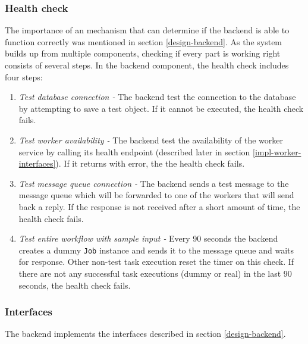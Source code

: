 \subsubsection{Health check} \label{impl-backend-healthcheck}

The importance of an mechanism that can determine if the backend is able to function correctly was mentioned in section \ref{design-backend}. As the system builds up from multiple components, checking if every part is working right consists of several steps. In the backend component, the health check includes four steps:

\begin{enumerate}
	\item \emph{Test database connection - }The backend test the connection to the database by attempting to save a test object. If it cannot be executed, the health check fails.
	\item \emph{Test worker availability - }The backend test the availability of the worker service by calling its health endpoint (described later in section \ref{impl-worker-interfaces}). If it returns with error, the the health check fails.
	\item \emph{Test message queue connection - }The backend sends a test message to the message queue which will be forwarded to one of the workers that will send back a reply. If the response is not received after a short amount of time, the health check fails.
	\item \emph{Test entire workflow with sample input - }Every 90 seconds the backend creates a dummy \texttt{Job} instance and sends it to the message queue and waits for response. Other non-test task execution reset the timer on this check. If there are not any successful task executions (dummy or real) in the last 90 seconds, the health check fails.
\end{enumerate}

\subsubsection{Interfaces} \label{impl-backend-interfaces}

The backend implements the interfaces described in section \ref{design-backend}.

